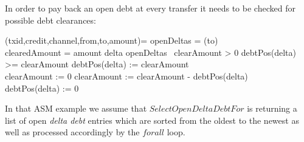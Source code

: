 In order to pay back an open debt at every transfer it needs to be checked for possible debt clearances:

\begin{asm}
	(txid,credit,channel,from,to,amount)=\+
		\LET openDeltas = (to)\\
		\LET clearedAmount = amount\+
			\FORALL delta \IN openDeltas \DO\ \IF clearAmount > 0 \THEN\+
				\IF debtPos(delta) >= clearAmount \THEN\+
					debtPos(delta) := clearAmount\\
					clearAmount := 0\-
				\ELSE\+
					clearAmount := clearAmount - debtPos(delta)\\
					debtPos(delta) := 0\-\-
\end{asm}

In that ASM example we assume that $SelectOpenDeltaDebtFor$ is returning a list of open \textit{delta debt} entries which are sorted from the oldest to the newest as well as processed accordingly by the $forall$ loop.